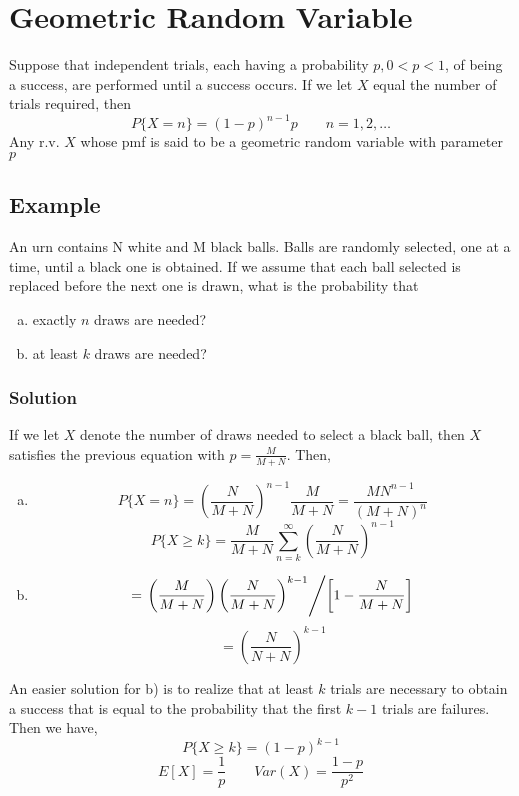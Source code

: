 \section{Geometric Random Variable}
Suppose that independent trials, each having a probability $p, 0 < p < 1$, of being a success, are performed until a success occurs. If we let $X$ equal the number of trials required, then \[P\{X = n\} = (1-p)^{n-1}p\qquad n= 1,2,\dots\]
Any r.v. $X$ whose pmf is said to be a geometric random variable with parameter $p$
\subsection*{Example}
An urn contains N white and M black balls. Balls are randomly selected, one at a time, until a black one is obtained. If we assume that each ball selected is replaced before the next one is drawn, what is the probability that
\begin{enumerate}[a. ]
    \item exactly $n$ draws are needed?
    \item at least $k$ draws are needed?
\end{enumerate}
\subsubsection*{Solution}
If we let $X$ denote the number of draws needed to select a black ball, then $X$ satisfies the previous equation with $p = \frac{M}{M+N}$. Then, 
\begin{enumerate}[a. ]
    \item \[P\{X = n\} = \left(\frac{N}{M + N}\right)^{n-1} \frac{M}{M+N} = \frac{MN^{n-1}}{(M+N)^n}\] \[P\{X\geq k\} = \frac{M}{M+N}\sum^\infty_{n=k} \left(\frac{N}{M+N}\right)^{n-1}\]
    \item \[ = \left.\left(\frac{M}{M+N}\right)\left(\frac{N}{M+N}\right)^{k-1}\middle/ \left[1 - \frac{N}{M+N}\right]\right.\]  \[ = \left(\frac{N}{N+N}\right)^{k-1}\]
\end{enumerate}
An easier solution for b) is to realize that at least $k$ trials are necessary to obtain a success that is equal to the probability that the first $k-1$ trials are failures. Then we have, 
\[P\{X\geq k\} = (1-p)^{k-1}\]
\[E[X] = \frac{1}{p}\qquad Var(X) = \frac{1- p}{p^2}\]
